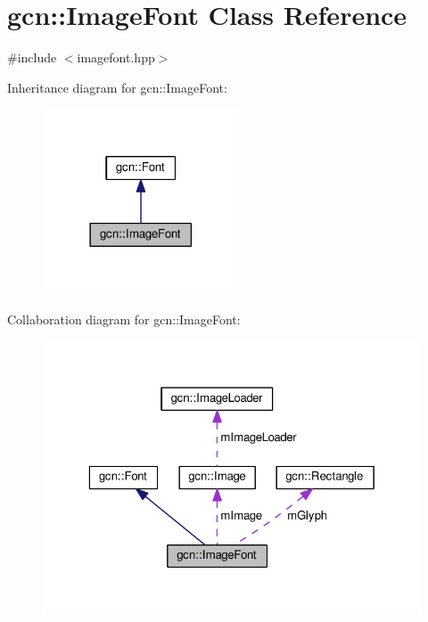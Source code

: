 \hypertarget{classgcn_1_1ImageFont}{}\section{gcn\+:\+:Image\+Font Class Reference}
\label{classgcn_1_1ImageFont}


{\ttfamily \#include $<$imagefont.\+hpp$>$}



Inheritance diagram for gcn\+:\+:Image\+Font\+:\nopagebreak
\begin{figure}[H]
\begin{center}
\leavevmode
\includegraphics[width=165pt]{classgcn_1_1ImageFont__inherit__graph}
\end{center}
\end{figure}


Collaboration diagram for gcn\+:\+:Image\+Font\+:\nopagebreak
\begin{figure}[H]
\begin{center}
\leavevmode
\includegraphics[width=323pt]{classgcn_1_1ImageFont__coll__graph}
\end{center}
\end{figure}
